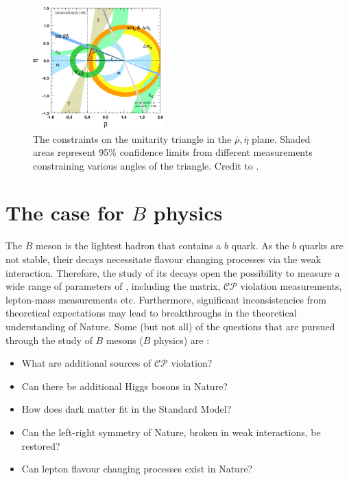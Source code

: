 \begin{figure}
    \centering
    \includegraphics[width=0.45\textwidth]{figures/sm_theory/unitarity_triangle.png}
    \caption{\label{fig:unitarity_triangle}The constraints on the unitarity triangle in the $\bar{\rho},\bar{\eta}$ plane.
    Shaded areas represent  95\% confidence limits from different measurements constraining various angles of the triangle.
    Credit to \cite{Workman:2022ynf}.
    }
\end{figure}

\section{The case for \texorpdfstring{$B$}{B} physics}\label{sec:bphysics_case}

The $B$ meson is the lightest hadron that contains a $b$ quark.
As the $b$ quarks are not stable, their decays necessitate flavour changing processes via the weak interaction.
Therefore, the study of its decays open the possibility to measure a wide range of parameters of \SM, including the \CKM matrix, $\mathcal{CP}$ violation measurements, lepton-mass measurements etc.
Furthermore, significant inconsistencies from theoretical expectations may lead to breakthroughs in the theoretical understanding of Nature.
Some (but not all) of the questions that are pursued through the study of $B$ mesons ($B$ physics) are \cite{Belle-II:2018jsg}:
\begin{itemize}
    \item What are additional sources of $\mathcal{CP}$ violation?
    \item Can there be additional Higgs bosons in Nature?
    \item How does dark matter fit in the Standard Model?
    \item Can the left-right symmetry of Nature, broken in weak interactions, be restored?
    \item Can lepton flavour changing processes exist in Nature?
\end{itemize}

